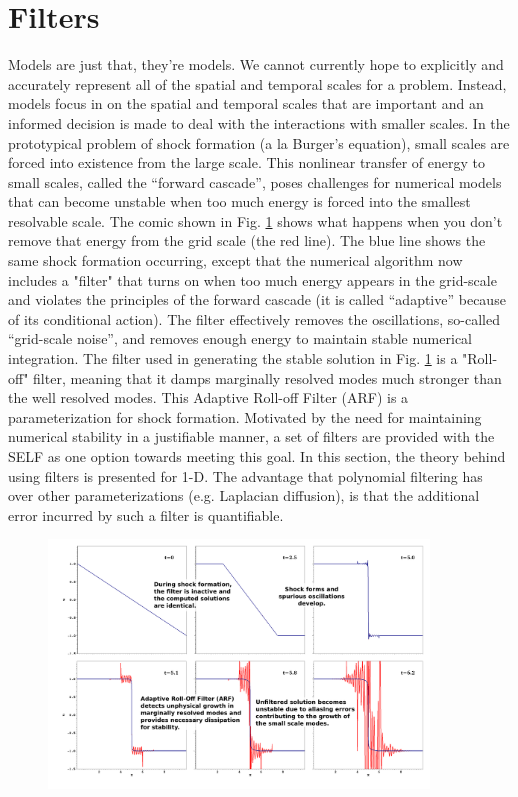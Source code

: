 \documentclass[12pt]{softwaremanual}
\begin{document}
\section{Filters}
Models are just that, they're models. We cannot currently hope to explicitly and accurately represent all of the spatial and temporal scales for a problem. Instead, models focus in on the spatial and temporal scales that are important and an informed decision is made to deal with the interactions with smaller scales. In the prototypical problem of shock formation (a la Burger's equation), small scales are forced into existence from the large scale. This nonlinear transfer of energy to small scales, called the ``forward cascade'', poses challenges for numerical models that can become unstable when too much energy is forced into the smallest resolvable scale. The comic shown in Fig. \ref{fig:shockFormation} shows what happens when you don't remove that energy from the grid scale (the red line). The blue line shows the same shock formation occurring, except that the numerical algorithm now includes a "filter" that turns on when too much energy appears in the grid-scale and violates the principles of the forward cascade (it is called ``adaptive'' because of its conditional action). The filter effectively removes the oscillations, so-called ``grid-scale noise'', and removes enough energy to maintain stable numerical integration. The filter used in generating the stable solution in Fig. \ref{fig:shockFormation} is a "Roll-off" filter, meaning that it damps marginally resolved modes much stronger than the well resolved modes. This Adaptive Roll-off Filter (ARF) is a parameterization for shock formation. Motivated by the need for maintaining numerical stability in a justifiable manner, a set of filters are provided with the SELF as one option towards meeting this goal. In this section, the theory behind using filters is presented for 1-D. The advantage that polynomial filtering has over other parameterizations (e.g. Laplacian diffusion), is that the additional error incurred by such a filter is quantifiable.

\begin{figure}
\begin{center}
\includegraphics[width=0.9\textwidth]{../figures/filters/burger1d-ARF15h10l/Comic-FilterDemo.png}
\caption{}\label{fig:shockFormation}
\end{center}
\end{figure}
\end{document}
